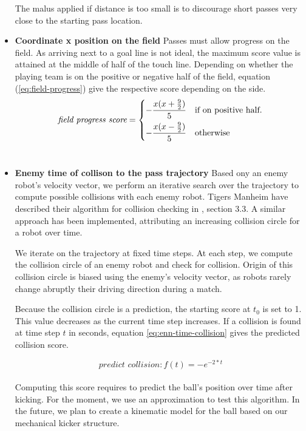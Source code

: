 \begin{itemize}
    The malus applied if distance is too small is to discourage
    short passes very close to the starting pass location. \\
    
    \item \textbf{Coordinate x position on the field}
    Passes must allow progress on the field. As arriving next to a goal line is not ideal, the maximum score value
    is attained at the middle of half of the touch line. Depending on whether the playing team is on the positive
    or negative half of the field, equation (\ref{eq:field-progress}) give the respective score depending on the side.
    \begin{equation}
        \label{eq:field-progress}
        \textit{field progress score} =
        \begin{dcases}
            -\frac{x (x + \frac{9}{2})}{5} & \text{if on positive half}. \\
            -\frac{x (x - \frac{9}{2})}{5} & \text{otherwise}
        \end{dcases}
    \end{equation} \\

    \item \textbf{Enemy time of collison to the pass trajectory}
    Based ony an enemy robot's velocity vector,
    we perform an iterative search over the trajectory to compute possible collisions with each
    enemy robot. Tigers Manheim have described their algorithm for collision checking in \cite{tdp_tigers_2024}, section 3.3.
    A similar approach has been implemented, attributing an increasing collision circle for a robot over time.

    We iterate on the trajectory at fixed time steps. At each step, we compute the collision circle of an enemy robot
    and check for collision. Origin of this collision circle is biased using the enemy's velocity vector, as robots rarely change
    abruptly their driving direction during a match.

    Because the collision circle is a prediction, the starting score at $t_0$ is set to 1. This value
    decreases as the current time step increases. If a collision is found at time step $t$ in seconds,
    equation \ref{eq:enn-time-collision} gives the predicted collision score.

    \begin{equation}
        \label{eq:enn-time-collision}
        \textit{predict collision}: f(t) = -e^{-2 * t}
    \end{equation} \\

    Computing this score requires to predict the ball's position over time after kicking.
    For the moment, we use an approximation to test this algorithm. In the future, we plan to create
    a kinematic model for the ball based on our mechanical kicker structure.

\end{itemize}


